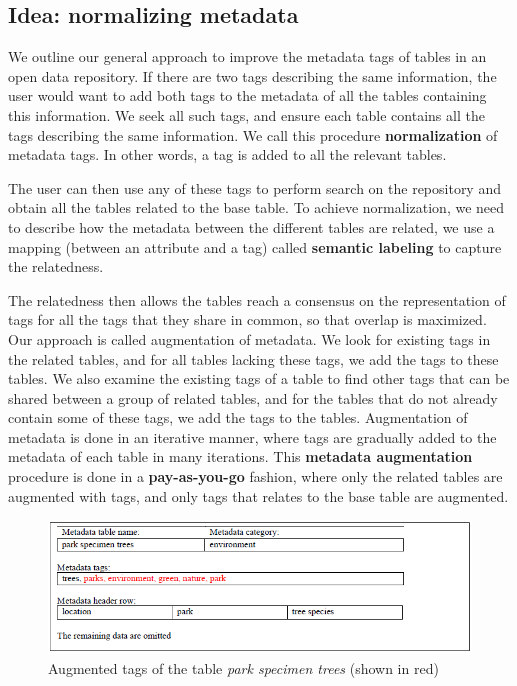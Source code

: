 \subsection{Idea: normalizing metadata}

We outline our general approach to improve the metadata tags of tables in an open data repository. If there are two tags describing the same information, the user would want to add both tags to the metadata of all the tables containing this information. We seek all such tags, and ensure each table contains all the tags describing the same information. We call this procedure \textbf{\gls{normalization}} of metadata tags. In other words, a tag is added to all the relevant tables.

The user can then use any of these tags to perform search on the repository and obtain all the tables related to the base table. To achieve normalization, we need to describe how the metadata between the different tables are related, we use a mapping (between an attribute and a tag) called \textbf{\gls{semantic labeling}} to capture the relatedness.

The relatedness then allows the tables reach a consensus on the representation of tags for all the tags that they share in common, so that overlap is maximized. Our approach is called augmentation of metadata. We look for existing tags in the related tables, and for all tables lacking these tags, we add the tags to these tables. We also examine the existing tags of a table to find other tags that can be shared between a group of related tables, and for the tables that do not already contain some of these tags, we add the tags to the tables. Augmentation of metadata is done in an iterative manner, where tags are gradually added to the metadata of each table in many iterations. This \textbf{\gls{metadata augmentation}} procedure is done in a \textbf{\gls{pay-as-you-go}} fashion, where only the related tables are augmented with tags, and only tags that relates to the base table are augmented.

\begin{figure}
    \centering
    \includegraphics[width=5in]{figures/augmented-park-specimen-trees.png}
    \caption{Augmented tags of the table \textit{park specimen trees} (shown in red)}
    \label{fig:augmented-park-specimen-trees}
\end{figure}

